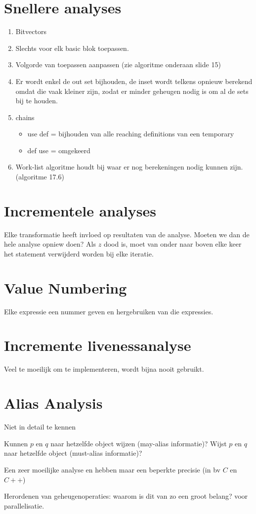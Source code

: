 \section{Snellere analyses}

\begin{enumerate}
	\item Bitvectors
	\item Slechts voor elk basic blok toepassen.
	\item Volgorde van toepassen aanpassen (zie algoritme onderaan slide 15)
	\item Er wordt enkel de out set bijhouden, de inset wordt telkens opnieuw berekend omdat die vaak kleiner zijn, zodat er minder geheugen nodig is om al de sets bij te houden.
	\item chains 
	\begin{itemize}
		\item use def  = bijhouden van alle reaching definitions van een temporary
		\item def use = omgekeerd
	\end{itemize}
	\item Work-list algoritme houdt bij waar er nog berekeningen nodig kunnen zijn. (algoritme 17.6)
\end{enumerate}

\section{Incrementele analyses}
Elke transformatie heeft invloed op resultaten van de analyse. Moeten we dan de hele analyse opniew doen? Als $z$ dood is, moet van onder naar boven elke keer het statement verwijderd worden bij elke iteratie.

\section{Value Numbering}
Elke expressie een nummer geven en hergebruiken van die expressies.

\section{Incremente livenessanalyse}
Veel te moeilijk om te implementeren, wordt bijna nooit gebruikt.

\section{Alias Analysis}
Niet in detail te kennen

Kunnen $p$ en $q$ naar hetzelfde object wijzen (may-alias informatie)?
Wijst $p$ en $q$ naar hetzelfde object (must-alias informatie)? 

Een zeer moeilijke analyse en hebben maar een beperkte precisie (in bv $C$ en $C++$)

Herordenen van geheugenoperaties: waarom is dit van zo een groot belang? voor parallelisatie.